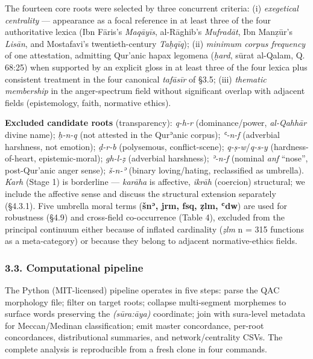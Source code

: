 The fourteen core roots were selected by three concurrent criteria: (i)
\emph{exegetical centrality} --- appearance as a focal reference in at
least three of the four authoritative lexica (Ibn Fāris's
\emph{Maqāyīs}, al-Rāghib's \emph{Mufradāt}, Ibn Manẓūr's \emph{Lisān},
and Mostafavi's twentieth-century \emph{Taḥqīq}); (ii) \emph{minimum
corpus frequency} of one attestation, admitting Qur'anic hapax legomena
(\emph{ḥard}, sūrat al-Qalam, Q. 68:25) when supported by an explicit
gloss in at least three of the four lexica plus consistent treatment in
the four canonical \emph{tafāsīr} of §3.5; (iii) \emph{thematic
membership} in the anger-spectrum field without significant overlap with
adjacent fields (epistemology, faith, normative ethics).

\textbf{Excluded candidate roots} (transparency): \emph{q-h-r}
(dominance/power, \emph{al-Qahhār} divine name); \emph{ḥ-n-q} (not
attested in the Qurʾanic corpus); \emph{ʿ-n-f} (adverbial harshness, not
emotion); \emph{ḍ-r-b} (polysemous, conflict-scene);
\emph{q-ṣ-w}/\emph{q-s-y} (hardness-of-heart, epistemic-moral);
\emph{gh-l-ẓ} (adverbial harshness); \emph{ʾ-n-f} (nominal \emph{anf}
``nose'', post-Qur'anic anger sense); \emph{š-n-ʾ} (binary
loving/hating, reclassified as umbrella). \emph{Karh} (Stage 1) is
borderline --- \emph{karāha} is affective, \emph{ikrāh} (coercion)
structural; we include the affective sense and discuss the structural
extension separately (§4.3.1). Five umbrella moral terms (\textbf{šnʾ,
jrm, fsq, ẓlm, ʿdw}) are used for robustness (§4.9) and cross-field
co-occurrence (Table 4), excluded from the principal continuum either
because of inflated cardinality (\emph{ẓlm} n = 315 functions as a
meta-category) or because they belong to adjacent normative-ethics
fields.

\subsubsection{3.3. Computational
pipeline}\label{computational-pipeline}

The Python (MIT-licensed) pipeline operates in five steps: parse the QAC
morphology file; filter on target roots; collapse multi-segment
morphemes to surface words preserving the \emph{(sūra:āya)} coordinate;
join with sura-level metadata for Meccan/Medinan classification; emit
master concordance, per-root concordances, distributional summaries, and
network/centrality CSVs. The complete analysis is reproducible from a
fresh clone in four commands.

